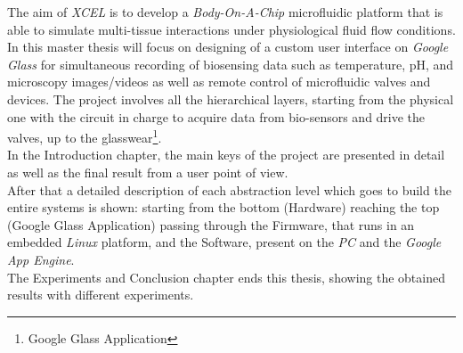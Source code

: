 The aim of \textit{XCEL} is to develop a \textit{Body-On-A-Chip} microfluidic platform that is able to simulate multi-tissue interactions under physiological fluid flow conditions.\\

In this master thesis will focus on designing of a custom user interface on \textit{Google Glass} for simultaneous recording of biosensing data such as temperature, pH, and microscopy images/videos as well as remote control of microfluidic valves and devices.  The project involves all the hierarchical layers, starting from the physical one with the circuit in charge to acquire data from bio-sensors and drive the valves, up to the glasswear\footnote{Google Glass Application}.\\

In the Introduction chapter, the main keys of the project are presented in detail as well as the final result from a user point of view.\\
After that a detailed description of each abstraction level which goes to build the entire systems is shown: starting from the bottom (Hardware) reaching the top (Google Glass Application) passing through the Firmware, that runs in an embedded \textit{Linux} platform, and the Software, present on the \textit{PC} and the \textit{Google App Engine}.\\
The Experiments and Conclusion chapter ends this thesis, showing the obtained results with different experiments.
